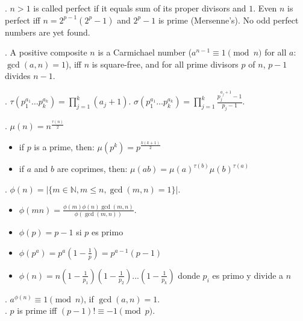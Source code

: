 
.  $n>1$ is called perfect if it equals
sum of its proper divisors and $1$.  Even $n$ is perfect iff $n = 2^{p-1} (2^p - 1)$
and $2^p - 1$ is prime (Mersenne's). No odd perfect numbers are yet found.

.
A positive composite $n$ is a Carmichael number
($a^{n-1} \equiv 1 \pmod{n}$ for all $a$: $\gcd(a,n)=1$),
iff $n$ is square-free, and for all prime divisors $p$ of $n$, $p-1$ divides $n-1$.

.
$\tau(p_1^{a_1} \dots p_k^{a_k}) = \prod_{j=1}^k (a_j+1)$. \quad
$\sigma(p_1^{a_1} \dots p_k^{a_k}) = \prod_{j=1}^k \frac{p_j^{a_j+1}-1}{p_j-1}$.

.
$\mu(n) = n^{\frac{\tau(n)}{2}}$
\begin{itemize}
\item if $p$ is a prime, then: $\mu(p^k) = p^{\frac{k(k+1)}{2}}$
\item if $a$ and $b$ are coprimes, then: $\mu(ab) = \mu(a)^{\tau(b)}\mu(b)^{\tau(a)}$
\end{itemize}

.  $\phi(n)=|\{m \in {\mathbb N}, m \le n, \gcd(m, n) = 1 \}|$.
  
\begin{itemize}
\item   $\phi(mn) = \frac{\phi(m) \phi(n) \gcd(m,n)}{\phi(\gcd(m,n))}$.
\item	$\phi(p) = p - 1$ si $p$ es primo
\item	$\phi(p^a) = p^a(1 - \frac{1}{p}) = p^{a-1} (p-1)$
\item	$\phi(n) = n(1 - \frac{1}{p_1})(1 - \frac{1}{p_2})...(1 - \frac{1}{p_k})$ donde $p_i$ es primo y divide a $n$
\end{itemize}


. $a^{\phi(n)} \equiv 1\pmod{n}$, if $\gcd(a,n)=1$. \\
. $p$ is prime iff $(p - 1)! \equiv -1 \pmod p$.

